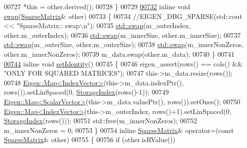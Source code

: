 \begin{DoxyCode}
00727       *\textcolor{keyword}{this} = other.derived();
00728     \}
00729 
\hyperlink{group___sparse_core___module_ae9b9ad3524f87276511397d988b7a607}{00732}     \textcolor{keyword}{inline} \textcolor{keywordtype}{void} \hyperlink{group___sparse_core___module_ae9b9ad3524f87276511397d988b7a607}{swap}(\hyperlink{group___sparse_core___module_class_eigen_1_1_sparse_matrix}{SparseMatrix}& other)
00733     \{
00734       \textcolor{comment}{//EIGEN\_DBG\_SPARSE(std::cout << "SparseMatrix:: swap\(\backslash\)n");}
00735       \hyperlink{endian_8c_a3ca5ecd34b04d6a243c054ac3a57f68d}{std::swap}(m\_outerIndex, other.m\_outerIndex);
00736       \hyperlink{endian_8c_a3ca5ecd34b04d6a243c054ac3a57f68d}{std::swap}(m\_innerSize, other.m\_innerSize);
00737       \hyperlink{endian_8c_a3ca5ecd34b04d6a243c054ac3a57f68d}{std::swap}(m\_outerSize, other.m\_outerSize);
00738       \hyperlink{endian_8c_a3ca5ecd34b04d6a243c054ac3a57f68d}{std::swap}(m\_innerNonZeros, other.m\_innerNonZeros);
00739       m\_data.swap(other.m\_data);
00740     \}
00741 
\hyperlink{group___sparse_core___module_a89013d2aa58413672c90932607a0d6f0}{00744}     \textcolor{keyword}{inline} \textcolor{keywordtype}{void} \hyperlink{group___sparse_core___module_a89013d2aa58413672c90932607a0d6f0}{setIdentity}()
00745     \{
00746       eigen\_assert(rows() == cols() && \textcolor{stringliteral}{"ONLY FOR SQUARED MATRICES"});
00747       this->m\_data.resize(rows());
00748       \hyperlink{group___core___module_class_eigen_1_1_map}{Eigen::Map<IndexVector>}(this->m\_data.indexPtr(), rows()).setLinSpaced(0, 
      \hyperlink{group___sparse_core___module_a0b540ba724726ebe953f8c0df06081ed}{StorageIndex}(rows()-1));
00749       \hyperlink{group___core___module_class_eigen_1_1_map}{Eigen::Map<ScalarVector>}(this->m\_data.valuePtr(), rows()).setOnes();
00750       \hyperlink{group___core___module_class_eigen_1_1_map}{Eigen::Map<IndexVector>}(this->m\_outerIndex, rows()+1).setLinSpaced(0, 
      \hyperlink{group___sparse_core___module_a0b540ba724726ebe953f8c0df06081ed}{StorageIndex}(rows()));
00751       std::free(m\_innerNonZeros);
00752       m\_innerNonZeros = 0;
00753     \}
00754     \textcolor{keyword}{inline} \hyperlink{group___sparse_core___module_class_eigen_1_1_sparse_matrix}{SparseMatrix}& operator=(\textcolor{keyword}{const} \hyperlink{group___sparse_core___module_class_eigen_1_1_sparse_matrix}{SparseMatrix}& other)
00755     \{
00756       \textcolor{keywordflow}{if} (other.isRValue())

\end{DoxyCode}
